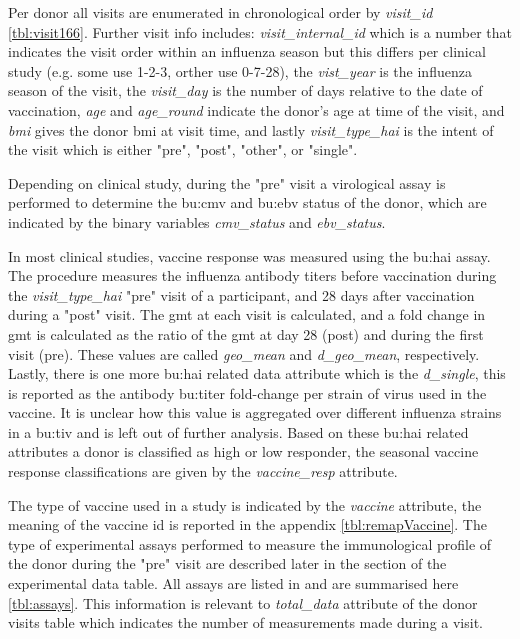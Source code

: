 Per donor all visits are enumerated in chronological order by \textit{visit\_id} \autoref{tbl:visit166}.
Further visit info includes: \textit{visit\_internal\_id} which is a number that indicates the visit order within an influenza season but this differs per clinical study (e.g. some use 1-2-3, orther use 0-7-28), the \textit{vist\_year} is the influenza season of the visit, the \textit{visit\_day} is the number of days relative to the date of vaccination,  \textit{age} and \textit{age\_round} indicate the donor's age at time of the visit, and \textit{bmi} gives the donor bmi at visit time, and lastly \textit{visit\_type\_hai} is the intent of the visit which is either "pre", "post", "other", or "single".

Depending on clinical study, during the "pre" visit a virological assay is performed to determine the \gls{bu:cmv} and \gls{bu:ebv} status of the donor, which are indicated by the binary variables \textit{cmv\_status} and \textit{ebv\_status}.

In most clinical studies, vaccine response was measured using the \gls{bu:hai} assay.
The procedure measures the influenza antibody titers before vaccination during the \textit{visit\_type\_hai} "pre" visit of a participant, and 28 days after vaccination during a "post" visit.
The \acrshort{gmt} at each visit is calculated, and a fold change in \acrshort{gmt} is calculated as the ratio of the \acrshort{gmt} at day 28 (post) and during the first visit (pre).
These values are called \textit{geo\_mean} and \textit{d\_geo\_mean}, respectively.
Lastly, there is one more \gls{bu:hai} related data attribute which is the \textit{d\_single}, this is reported as the antibody \gls{bu:titer} fold-change per strain of virus used in the vaccine.
It is unclear how this value is aggregated over different influenza strains in a \gls{bu:tiv} and is left out of further analysis.
Based on these \gls{bu:hai} related attributes a donor is classified as high or low responder, the seasonal vaccine response classifications are given by the \textit{vaccine\_resp} attribute.

The type of vaccine used in a study is indicated by the \textit{vaccine} attribute, the meaning of the vaccine id is reported in the appendix \autoref{tbl:remapVaccine}.
The type of experimental assays performed to measure the immunological profile of the donor during the "pre" visit are described later in the section of the experimental data table.
All assays are listed in \dpaper and are summarised here \autoref{tbl:assays}.
This information is relevant to \textit{total\_data} attribute of the donor visits table which indicates the number of measurements made during a visit.

